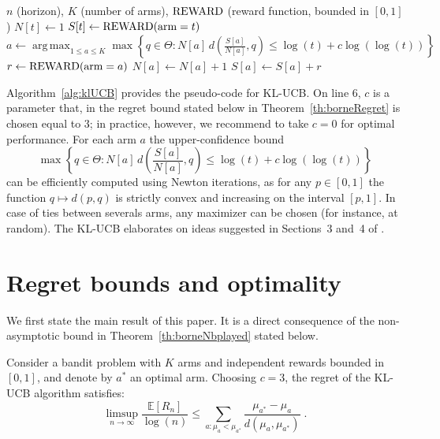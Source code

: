 \documentclass[wcp]{jmlr}
\newcommand{\E}{\mathbb{E}}
\newcommand{\1}{\mathbbm{1}}
\def\gets{\leftarrow}
\def\arm{\hbox{arm}}
\def\reward{\hbox{REWARD}}
\def\argmax{\operatorname*{arg\,max}}
\begin{document}
\begin{algorithm}
  \caption{KL-UCB}
  \label{alg:klUCB}
  \begin{algorithmic}[1]
    \REQUIRE $n$ (horizon), $K$ (number of arms), $\reward$ (reward function,
    bounded in $[0,1]$)  \STATE $N[t] \gets 1$
    \STATE $S[t] \gets \reward(\arm=t)$
    \ENDFOR
     \STATE $a \gets \argmax_{1\leq a\leq K}
    \max\left\{q\in\Theta : N[a]\,d\left( \frac{S[a]}{N[a]}, q \right) \leq
      \log(t) + c\log(\log(t))\right\}$ \STATE $r \gets \reward(\arm=a)$ \STATE
    $N[a] \gets N[a]+1$ \STATE $S[a] \gets S[a]+r$
    \ENDFOR
  \end{algorithmic}
\end{algorithm}

Algorithm~\ref{alg:klUCB} provides the pseudo-code for KL-UCB. On line 6, $c$ is a parameter that, in the regret
bound stated below in Theorem~\ref{th:borneRegret} is chosen equal to $3$; in
practice, however, we recommend to take $c=0$ for optimal performance.
For each arm $a$ the upper-confidence bound
\[\max\left\{q\in\Theta : N[a]\,d\left( \frac{S[a]}{N[a]}, q \right) \leq
  \log(t) + c\log(\log(t))\right\}\] 
can be efficiently computed using Newton iterations, as for any $p\in[0,1]$ the
function $q\mapsto d(p,q)$ is strictly convex and increasing on the
interval $[p, 1]$. In case of ties between severals arms, any maximizer can be
chosen (for instance, at random).
The KL-UCB elaborates on ideas suggested in Sections~3 and~4 of \cite{LaiRobbins85bandits}.


\section{Regret bounds and optimality} \label{sec:bound} We first state the
main result of this paper.  It is a direct consequence of the non-asymptotic
bound in Theorem~\ref{th:borneNbplayed} stated below.
\begin{theorem}\label{th:borneRegret}
  Consider a bandit problem with $K$ arms and independent rewards bounded in
  $[0,1]$, and denote by $a^*$ an optimal arm.  Choosing $c=3$, the regret of
  the KL-UCB algorithm satisfies:
  \[\limsup_{n\to\infty} \frac{\E[R_n]}{\log(n)} \leq \sum_{a:\mu_a<\mu_{a^*}}
  \frac{\mu_{a^*}-\mu_a}{d(\mu_a, \mu_{a^*})}\;.\]
\end{theorem}
\end{document}
